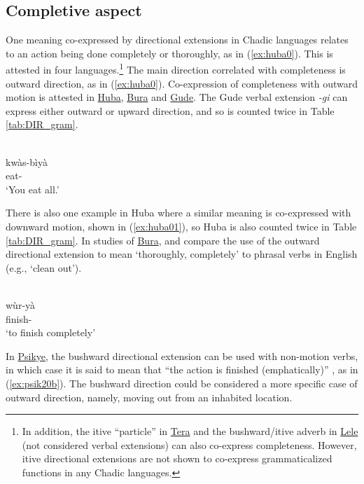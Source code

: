 \subsection{Completive aspect} \label{sec:tense}

One meaning co-expressed by directional extensions in Chadic languages relates to an action being done completely or thoroughly, as in (\ref{ex:huba0}). This is attested in four languages.\footnote{In addition, the itive ``particle'' in \hyperref[tera]{Tera} and the bushward/itive adverb in \hyperref[lele]{Lele} (not considered verbal extensions) can also co-express completeness. However, itive directional extensions are not shown to co-express grammaticalized functions in any Chadic languages.} The main direction correlated with completeness is outward direction, as in (\ref{ex:huba0}). Co-expression of completeness with outward motion is attested in \hyperref[huba]{Huba}, \hyperref[bura]{Bura} and \hyperref[gude]{Gude}. The Gude verbal extension \textit{-gi} can express either outward or upward direction, and so is counted twice in Table \ref{tab:DIR_gram}. 

\ea\label{ex:huba0}
 \\
\gll kwàs-bìyà	\\
eat-		\\
\glt `You eat all.'
\z 

There is also one example in Huba where a similar meaning is co-expressed with downward motion, shown in (\ref{ex:huba01}), so Huba is also counted twice in Table \ref{tab:DIR_gram}. In studies of \hyperref[bura]{Bura}, \citet[274]{hoffmannUntersuchungenZurStruktur1955} and \citet[3]{blenchBuraVerbalExtensions2010} compare the use of the outward directional extension to mean `thoroughly, completely' to phrasal verbs in English (e.g., `clean out'). 

\ea\label{ex:huba01}
 \\
\gll wùr-yà	\\
finish-	\\
\glt `to finish completely'
\z 

In \hyperref[psik]{Psikye}, the bushward directional extension can be used with non-motion verbs, in which case it is said to mean that ``the action is finished (emphatically)'' \citep[114, 163]{smithKapsikiLanguage1969}, as in (\ref{ex:psik20b}). The bushward direction could be considered a more specific case of outward direction, namely, moving out from an inhabited location. 

